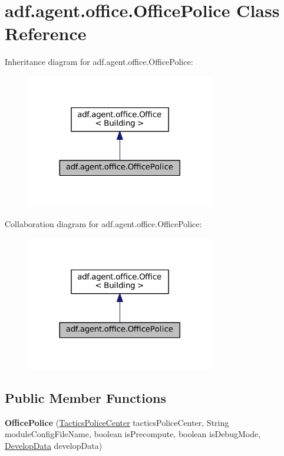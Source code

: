 \hypertarget{classadf_1_1agent_1_1office_1_1OfficePolice}{}\section{adf.\+agent.\+office.\+Office\+Police Class Reference}
\label{classadf_1_1agent_1_1office_1_1OfficePolice}


Inheritance diagram for adf.\+agent.\+office.\+Office\+Police\+:
\nopagebreak
\begin{figure}[H]
\begin{center}
\leavevmode
\includegraphics[width=233pt]{classadf_1_1agent_1_1office_1_1OfficePolice__inherit__graph}
\end{center}
\end{figure}


Collaboration diagram for adf.\+agent.\+office.\+Office\+Police\+:
\nopagebreak
\begin{figure}[H]
\begin{center}
\leavevmode
\includegraphics[width=233pt]{classadf_1_1agent_1_1office_1_1OfficePolice__coll__graph}
\end{center}
\end{figure}
\subsection*{Public Member Functions}
\begin{DoxyCompactItemize}
\item 
\hypertarget{classadf_1_1agent_1_1office_1_1OfficePolice_a16892e4fcb4e24c014c1c2ff7e7deee3}{}\label{classadf_1_1agent_1_1office_1_1OfficePolice_a16892e4fcb4e24c014c1c2ff7e7deee3} 
{\bfseries Office\+Police} (\hyperlink{classadf_1_1component_1_1tactics_1_1center_1_1TacticsPoliceCenter}{Tactics\+Police\+Center} tactics\+Police\+Center, String module\+Config\+File\+Name, boolean is\+Precompute, boolean is\+Debug\+Mode, \hyperlink{classadf_1_1agent_1_1develop_1_1DevelopData}{Develop\+Data} develop\+Data)
\end{DoxyCompactItemize}
